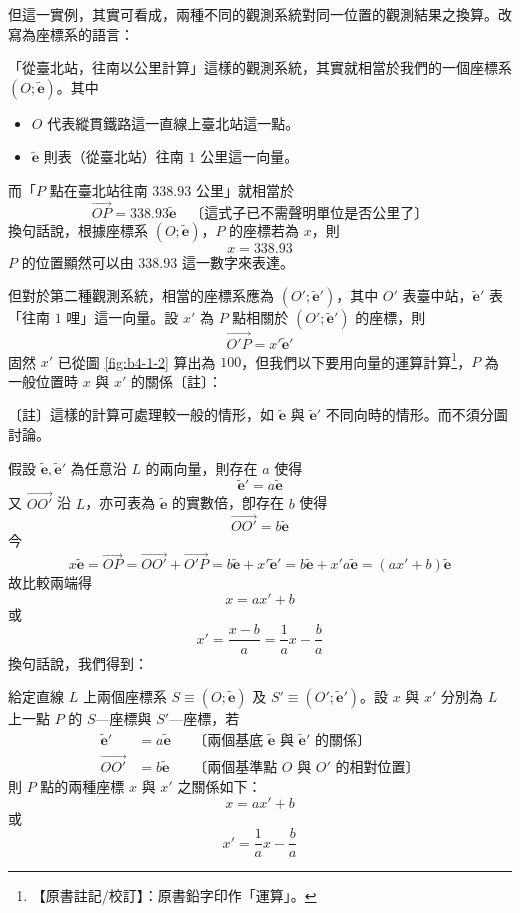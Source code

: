 但這一實例，其實可看成，兩種不同的觀測系統對同一位置的觀測結果之換算。改寫為座標系的語言：

「從臺北站，往南以公里計算」這樣的觀測系統，其實就相當於我們的一個座標系 $(O; \tilde{\mathbf{e}})$。其中
\begin{itemize}
  \item $O$ 代表縱貫鐵路這一直線上臺北站這一點。
  \item $\tilde{\mathbf{e}}$ 則表（從臺北站）往南 $1$ 公里這一向量。
\end{itemize}
而「$P$ 點在臺北站往南 $338.93$ 公里」就相當於
\[ \vec{OP} = 338.93 \tilde{\mathbf{e}} \quad \text{〔這式子已不需聲明單位是否公里了〕} \]
換句話說，根據座標系 $(O; \tilde{\mathbf{e}})$，$P$ 的座標若為 $x$，則
\[ x = 338.93 \]
$P$ 的位置顯然可以由 $338.93$ 這一數字來表達。

但對於第二種觀測系統，相當的座標系應為 $(O'; \tilde{\mathbf{e}}')$，其中 $O'$ 表臺中站，$\tilde{\mathbf{e}}'$ 表「往南 $1$ 哩」這一向量。設 $x'$ 為 $P$ 點相關於 $(O'; \tilde{\mathbf{e}}')$ 的座標，則
\[ \vec{O'P} = x' \tilde{\mathbf{e}}' \]
固然 $x'$ 已從圖 \ref{fig:b4-1-2} 算出為 $100$，但我們以下要用向量的運算計算\label{note:b4-ch1-p4-yunsuan}\footnote{【原書註記/校訂】：原書鉛字印作「運算」。}，$P$ 為一般位置時 $x$ 與 $x'$ 的關係〔註〕：

〔註〕這樣的計算可處理較一般的情形，如 $\tilde{\mathbf{e}}$ 與 $\tilde{\mathbf{e}}'$ 不同向時的情形。而不須分圖討論。

假設 $\tilde{\mathbf{e}}, \tilde{\mathbf{e}}'$ 為任意沿 $L$ 的兩向量，則存在 $a$ 使得
\[ \tilde{\mathbf{e}}' = a \tilde{\mathbf{e}} \]
又 $\vec{OO'}$ 沿 $L$，亦可表為 $\tilde{\mathbf{e}}$ 的實數倍，卽存在 $b$ 使得
\[ \vec{OO'} = b \tilde{\mathbf{e}} \]
今
\[ x \tilde{\mathbf{e}} = \vec{OP} = \vec{OO'} + \vec{O'P} = b \tilde{\mathbf{e}} + x' \tilde{\mathbf{e}}' = b \tilde{\mathbf{e}} + x' a \tilde{\mathbf{e}} = (ax' + b) \tilde{\mathbf{e}} \]
故比較兩端得
\[ x = ax' + b \]
或
\[ x' = \frac{x - b}{a} = \frac{1}{a} x - \frac{b}{a} \]
換句話說，我們得到：

\begin{theorem}[定理 1]
給定直線 $L$ 上兩個座標系 $S \equiv (O; \tilde{\mathbf{e}})$ 及 $S' \equiv (O'; \tilde{\mathbf{e}}')$。設 $x$ 與 $x'$ 分別為 $L$ 上一點 $P$ 的 $S$---座標與 $S'$---座標，若
\begin{align}
\tilde{\mathbf{e}}' &= a \tilde{\mathbf{e}} && \text{〔兩個基底 $\tilde{\mathbf{e}}$ 與 $\tilde{\mathbf{e}}'$ 的關係〕} \label{eq:b4-1-1-2} \\
\vec{OO'} &= b \tilde{\mathbf{e}} && \text{〔兩個基準點 $O$ 與 $O'$ 的相對位置〕} \label{eq:b4-1-1-2p}
\end{align}
則 $P$ 點的兩種座標 $x$ 與 $x'$ 之關係如下：
\begin{equation}
x = ax' + b \label{eq:b4-1-1-3}
\end{equation}
或
\begin{equation}
x' = \frac{1}{a} x - \frac{b}{a} \label{eq:b4-1-1-3p}
\end{equation}
\end{theorem}

